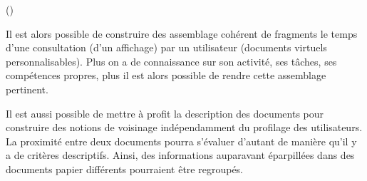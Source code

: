  (\cite{Balpe1990})

Il est alors possible de construire des assemblage cohérent de fragments le temps d'une consultation (d'un affichage) par un utilisateur (documents virtuels personnalisables).
Plus on a de connaissance sur son activité, ses tâches, ses compétences propres, plus il est alors possible de rendre cette assemblage pertinent. 

Il est aussi possible de mettre à profit la description des documents pour construire des notions de voisinage indépendamment du profilage des utilisateurs. 
La proximité entre deux documents pourra s'évaluer d'autant de manière qu'il y a de critères descriptifs.
Ainsi, des informations auparavant éparpillées dans des documents papier différents pourraient être regroupés. 


